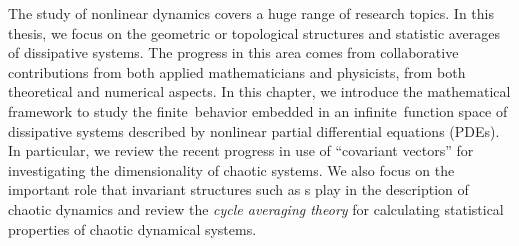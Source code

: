 
The study of nonlinear dynamics covers a huge range of research topics.
In this thesis, we focus on the geometric or topological structures and
statistic averages of dissipative systems. The progress in this area comes
from collaborative contributions from both applied mathematicians and
physicists, from both theoretical and numerical aspects.
In this chapter, we introduce the mathematical framework to study the
finite\dmn\ behavior embedded in an infinite\dmn\ function
space of dissipative systems described by nonlinear partial differential
equations (PDEs).
In particular, we review the recent progress in use of ``covariant vectors'' for
investigating the dimensionality of chaotic systems.
We also focus on the important role that invariant structures such as \po s
play in the description of chaotic dynamics and review the \emph{cycle averaging
theory} for calculating statistical properties of chaotic
dynamical systems.
